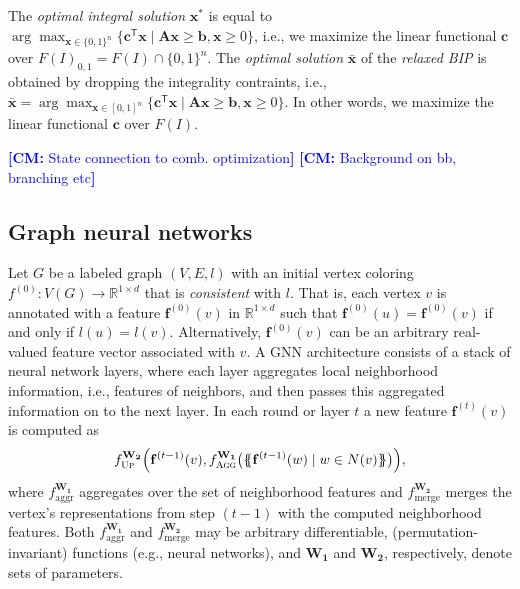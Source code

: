 \documentclass[11pt, DIV=12]{scrartcl}
\theoremstyle{definition}
\newcommand{\new}[1]{\emph{#1}}
\newcommand{\bbR}{\ensuremath{\mathbb{R}}}
\newcommand{\RR}{\mathbb{R}}
\newcommand{\oms}{\{\!\!\{}
\newcommand{\cms}{\}\!\!\}}
\newcommand{\trans}{^\mathsf{T}}
\renewcommand{\vec}[1]{\mathbf{#1}}
\newcommand{\cm}[1]{{{\textcolor{blue}{\textbf{[CM:} {#1}\textbf{]}}}}}
\begin{document}
The \new{optimal integral solution} $\vec{x}^*$ is equal to $\arg\max_{\vec{x} \in \{0,1\}^n} \{ \vec{c}\trans \vec{x} \mid \vec{A} \vec{x} \geq \vec{b}, \vec{x} \geq 0  \}$, i.e., we maximize the linear functional $\vec{c}$ over $F(I)_{0,1} = F(I) \cap \{ 0,1 \}^n$. The \emph{optimal solution} $\bar{\vec{x}}$ of the \new{relaxed BIP} is obtained by dropping the integrality contraints, i.e., $\vec{\bar{x}} = \arg\max_{\vec{x} \in [0,1]^n} \{ \vec{c}\trans \vec{x} \mid \vec{A} \vec{x} \geq \vec{b}, \vec{x} \geq 0 \}$. In other words, we maximize the linear functional $\vec{c}$ over $F(I)$.


\cm{State connection to comb. optimization}
\cm{Background on bb, branching etc}

\subsection{Graph neural networks}
Let $G$ be a labeled graph $(V,E,l)$ with an initial vertex coloring $f^{(0)} \colon V(G)\rightarrow \RR^{1\times d}$ that is \emph{consistent} with $l$. That is, each vertex $v$ is annotated with a feature $\vec{f}^{(0)}(v)$ in $\bbR^{1\times d}$ such that $\vec{f}^{(0)}(u) = \vec{f}^{(0)}(v)$ if and only if $l(u) = l(v)$.
Alternatively, $\vec{f}^{(0)}(v)$ can be an arbitrary  real-valued feature vector associated with $v$. A GNN architecture consists of a stack of neural network layers, where each layer aggregates local neighborhood information, i.e., features of neighbors, and then passes this aggregated information on to the next layer.  In each round or layer $t$ a new feature $\vec{f}^{(t)}(v)$ is computed as
\begin{equation}\label{eq:gnngeneral}
f^{\vec{W_2}}_{\textsc{Up}}\Big(\vec{f}^{(t-1)}(v) ,f^{\vec{W_1}}_{\textsc{Agg}}\big(\oms  \vec{f}^{(t-1)}(w) \mid  w \in N(v) \cms \big)\Big),
\end{equation}
where $f^{\vec{W_1}}_{\text{aggr}}$ aggregates over the set of neighborhood features and $f^{\vec{W_2}}_{\text{merge}}$ merges the vertex's representations from step $(t-1)$ with the computed neighborhood features.
Both $f^{\vec{W_1}}_{\text{aggr}}$ and $f^{\vec{W_2}}_{\text{merge}}$ may be arbitrary differentiable, (permutation-invariant) functions (e.g., neural networks), and $\vec{W_1}$ and $\vec{W_2}$, respectively, denote sets of parameters.
\end{document}
